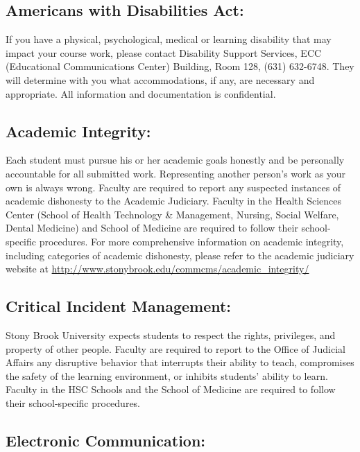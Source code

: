 \documentclass[11pt]{article}
\begin{document}
\subsection*{Americans with Disabilities Act: }

\noindent If you have a physical, psychological, medical or learning
disability that may impact your course work, please contact Disability
Support Services, ECC (Educational Communications Center) Building,
Room 128, (631) 632-6748. They will determine with you what
accommodations, if any, are necessary and appropriate. All information
and documentation is confidential.



\subsection*{Academic Integrity: }

\noindent Each student must pursue his or her academic goals honestly
and be personally accountable for all submitted work.  Representing
another person's work as your own is always wrong.  Faculty are
required to report any suspected instances of academic dishonesty to
the Academic Judiciary. Faculty in the Health Sciences Center (School
of Health Technology \& Management, Nursing, Social Welfare, Dental
Medicine) and School of Medicine are required to follow their
school-specific procedures. For more comprehensive information on
academic integrity, including categories of academic dishonesty,
please refer to the academic judiciary website at
\url{http://www.stonybrook.edu/commcms/academic_integrity/}



\subsection*{Critical Incident Management: }

\noindent Stony Brook University expects students to respect the
rights, privileges, and property of other people. Faculty are required
to report to the Office of Judicial Affairs any disruptive behavior
that interrupts their ability to teach, compromises the safety of the
learning environment, or inhibits students' ability to learn.  Faculty
in the HSC Schools and the School of Medicine are required to follow
their school-specific procedures.



\subsection*{Electronic Communication: }
\end{document}
